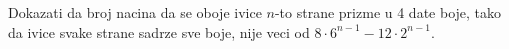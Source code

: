 \problem
Dokazati da broj nacina da se oboje ivice $n$-to strane prizme u 4 date boje, tako da ivice svake strane sadrze sve boje, nije veci od $8 \cdot 6^{n-1} - 12 \cdot 2^{n-1}$.
\solution
\endproblem
